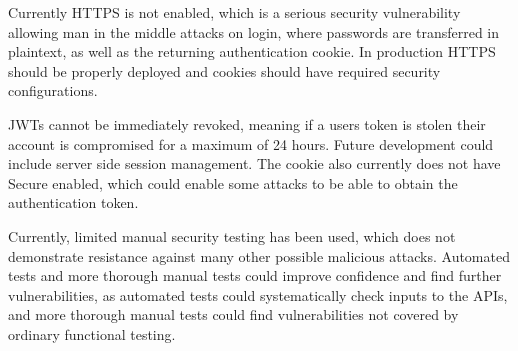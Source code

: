 Currently HTTPS is not enabled, which is a serious security vulnerability allowing man in the middle attacks on login, where passwords are transferred in plaintext, as well as the returning authentication cookie. In production HTTPS should be properly deployed and cookies should have required security configurations.

JWTs cannot be immediately revoked, meaning if a users token is stolen their account is compromised for a maximum of 24 hours. Future development could include server side session management. The cookie also currently does not have Secure enabled, which could enable some attacks to be able to obtain the authentication token.

Currently, limited manual security testing has been used, which does not demonstrate resistance against many other possible malicious attacks. Automated tests and more thorough manual tests could improve confidence and find further vulnerabilities, as automated tests could systematically check inputs to the APIs, and more thorough manual tests could find vulnerabilities not covered by ordinary functional testing.






